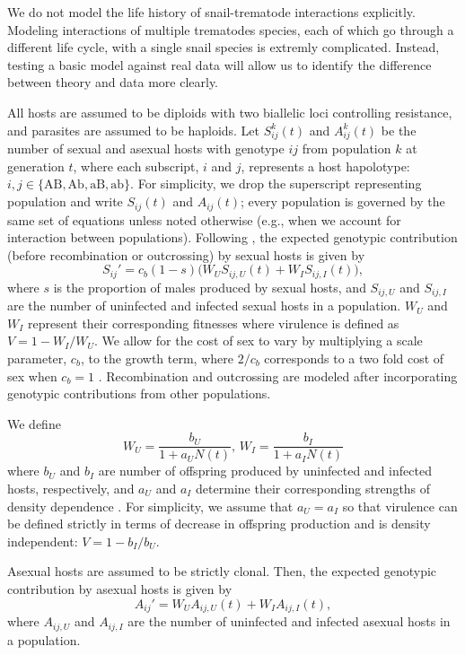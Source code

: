 \documentclass{article}\usepackage[]{graphicx}\usepackage[]{color}
\begin{document}
We do not model the life history of snail-trematode interactions explicitly.
Modeling interactions of multiple trematodes species, each of which go through a different life cycle, with a single snail species is extremly complicated.
Instead, testing a basic model against real data will allow us to identify the difference between theory and data more clearly.

All hosts are assumed to be diploids with two biallelic loci controlling resistance, and parasites are assumed to be haploids.
Let $S_{ij}^k(t)$ and $A_{ij}^k(t)$ be the number of sexual and asexual hosts with genotype $ij$ from population $k$ at generation $t$, 
where each subscript, $i$ and $j$, represents a host hapolotype: $i, j \in \{\mathrm{AB}, \mathrm{Ab}, \mathrm{aB}, \mathrm{ab}\}$.
For simplicity, we drop the superscript representing population and write $S_{ij}(t)$ and $A_{ij}(t)$;
every population is governed by the same set of equations unless noted otherwise (e.g., when we account for interaction between populations).
Following \cite{lively2010epidemiological}, the expected genotypic contribution (before recombination or outcrossing) by sexual hosts is given by
\begin{equation}
S_{ij}' = c_b (1-s) \bigg(W_U S_{ij,U} (t) + W_I S_{ij,I} (t)\bigg),
\end{equation}
where $s$ is the proportion of males produced by sexual hosts, and $S_{ij, U}$ and $S_{ij,I}$ are the number of uninfected and infected sexual hosts in a population.
$W_U$ and $W_I$ represent their corresponding fitnesses where virulence is defined as $V = 1-W_I/W_U$.
We allow for the cost of sex to vary by multiplying a scale parameter, $c_b$, to the growth term, where $2/c_b$ corresponds to a two fold cost of sex when $c_b = 1$ \citep{ashby2015diversity}.
Recombination and outcrossing are modeled after incorporating genotypic contributions from other populations.

We define
$$
W_U = \frac{b_U}{1 + a_U N(t)},\,  W_I = \frac{b_I}{1 + a_I N(t)}
$$
where $b_U$ and $b_I$ are number of offspring produced by uninfected and infected hosts, respectively, and $a_U$ and $a_I$ determine their corresponding strengths of density dependence \citep{lively2010epidemiological, smith1973stability}.
For simplicity, we assume that $a_U = a_I$ so that virulence can be defined strictly in terms of decrease in offspring production and is density independent: $V = 1- b_I/b_U$.

Asexual hosts are assumed to be strictly clonal.
Then, the expected genotypic contribution by asexual hosts is given by
\begin{equation}
A_{ij}' = W_U A_{ij,U} (t) + W_I A_{ij,I} (t),
\end{equation}
where $A_{ij, U}$ and $A_{ij,I}$ are the number of uninfected and infected asexual hosts in a population.
\end{document}

